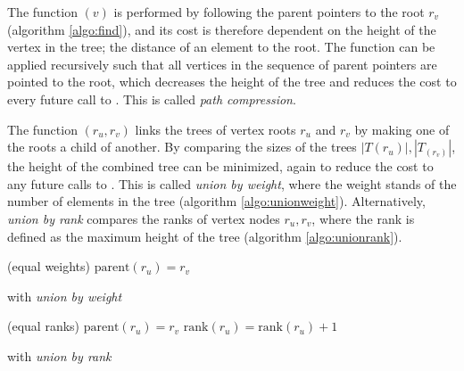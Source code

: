 The function $(v)$ is performed by following the parent pointers to the root $r_v$ (algorithm \ref{algo:find}), and its cost is therefore dependent on the height of the vertex in the tree; the distance of an element to the root. The function can be applied recursively such that all vertices in the sequence of parent pointers are pointed to the root, which decreases the height of the tree and reduces the cost to every future call to . This is called \emph{path compression}. 
\begin{algorithm}[htb]
  \BlankLine
  \BlankLine
  \BlankLine
  \caption{}\label{algo:find}
\end{algorithm}

The function $(r_u,r_v)$ links the trees of vertex roots $r_u$ and $r_v$ by making one of the roots a child of another. By comparing the sizes of the trees $|T(r_u)|, |T_(r_v)|$, the height of the combined tree can be minimized, again to reduce the cost to any future calls to . This is called \emph{union by weight}, where the weight stands of the number of elements in the tree (algorithm \ref{algo:unionweight}). Alternatively, \emph{union by rank} compares the ranks of vertex nodes $r_u,r_v$, where the rank is defined as the maximum height of the tree (algorithm \ref{algo:unionrank}).
\begin{algorithm}[htb]
  \BlankLine
  \BlankLine
  \Else(equal weights){
    $\text{parent}(r_u)=r_v$ \;
  }
  \BlankLine
  \caption{ with \emph{union by weight}}\label{algo:unionweight}
\end{algorithm}

\begin{algorithm}[htb]
  \BlankLine
  \BlankLine
  \Else(equal ranks){
    $\text{parent}(r_u)=r_v$ \;
    $\text{rank}(r_u) = \text{rank}(r_u) + 1$ \;
  }
  \BlankLine
  \caption{ with \emph{union by rank}}\label{algo:unionrank}
\end{algorithm}

